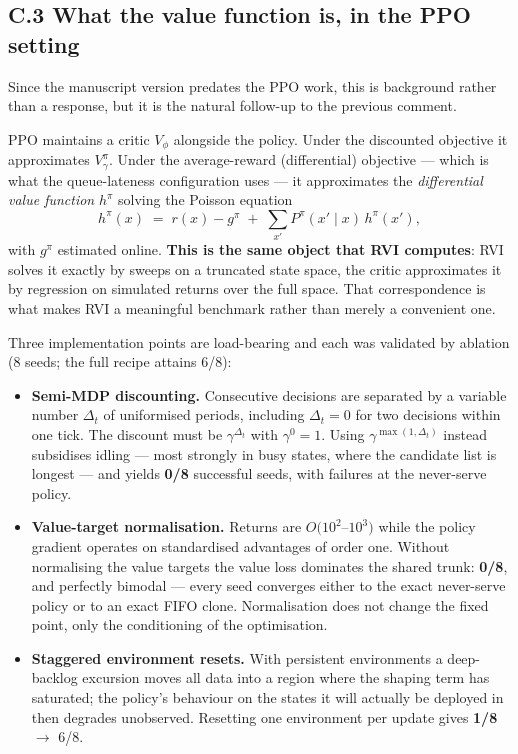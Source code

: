 \documentclass[11pt,a4paper]{article}
\begin{document}
\subsection*{C.3 What the value function is, in the PPO setting}

Since the manuscript version predates the PPO work, this is background rather
than a response, but it is the natural follow-up to the previous comment.

PPO maintains a critic $V_\phi$ alongside the policy.  Under the discounted
objective it approximates $V^\pi_\gamma$.  Under the average-reward
(differential) objective --- which is what the queue-lateness configuration
uses --- it approximates the \emph{differential value function} $h^\pi$ solving
the Poisson equation
\[
  h^\pi(x) \;=\; r(x) - g^\pi \;+\; \sum_{x'} P^\pi(x'\mid x)\, h^\pi(x') ,
\]
with $g^\pi$ estimated online.  \textbf{This is the same object that RVI
computes}: RVI solves it exactly by sweeps on a truncated state space, the
critic approximates it by regression on simulated returns over the full space.
That correspondence is what makes RVI a meaningful benchmark rather than merely
a convenient one.

Three implementation points are load-bearing and each was validated by ablation
(8 seeds; the full recipe attains 6/8):
\begin{itemize}
  \item \textbf{Semi-MDP discounting.}  Consecutive decisions are separated by
  a variable number $\Delta_t$ of uniformised periods, including
  $\Delta_t = 0$ for two decisions within one tick.  The discount must be
  $\gamma^{\Delta_t}$ with $\gamma^0 = 1$.  Using $\gamma^{\max(1,\Delta_t)}$
  instead subsidises idling --- most strongly in busy states, where the
  candidate list is longest --- and yields \textbf{0/8} successful seeds, with
  failures at the never-serve policy.
  \item \textbf{Value-target normalisation.}  Returns are $O(10^2$--$10^3)$
  while the policy gradient operates on standardised advantages of order one.
  Without normalising the value targets the value loss dominates the shared
  trunk: \textbf{0/8}, and perfectly bimodal --- every seed converges either to
  the exact never-serve policy or to an exact FIFO clone.  Normalisation does
  not change the fixed point, only the conditioning of the optimisation.
  \item \textbf{Staggered environment resets.}  With persistent environments a
  deep-backlog excursion moves all data into a region where the shaping term
  has saturated; the policy's behaviour on the states it will actually be
  deployed in then degrades unobserved.  Resetting one environment per update
  gives \textbf{1/8} $\to$ 6/8.
\end{itemize}
\end{document}
